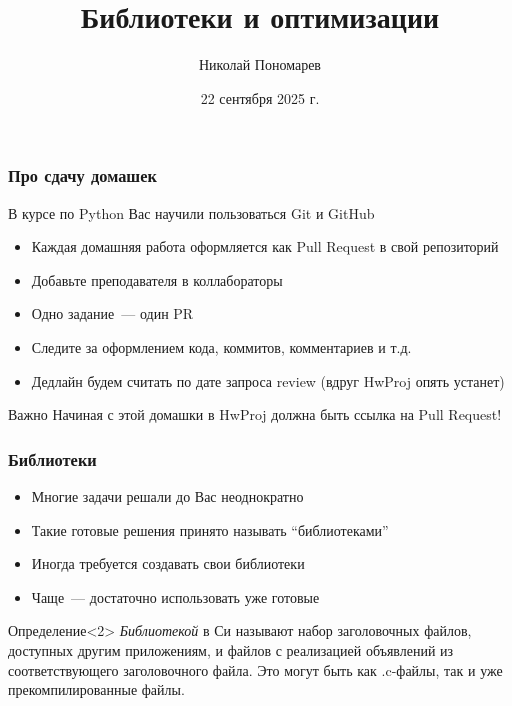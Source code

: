 \documentclass[aspectratio=169]{beamer}
\title{Библиотеки и оптимизации}
\author{Николай Пономарев}
\date{22 сентября 2025 г.}
\begin{document}
\begin{frame}
    \titlepage
\end{frame}

\begin{frame}
    \frametitle{Про сдачу домашек}

    В курсе по Python Вас научили пользоваться Git и GitHub

    \begin{itemize}
        \item Каждая домашняя работа оформляется как Pull Request в свой репозиторий
        \item Добавьте преподавателя в коллабораторы
        \item Одно задание~--- один PR
        \item Следите за оформлением кода, коммитов, комментариев и т.д.
        \item Дедлайн будем считать по дате запроса review (вдруг HwProj опять устанет)
    \end{itemize}

    \begin{alertblock}{Важно}
        Начиная с этой домашки в HwProj должна быть ссылка на Pull Request!
    \end{alertblock}
\end{frame}

\begin{frame}
    \frametitle{Библиотеки}

    \begin{itemize}
        \item Многие задачи решали до Вас неоднократно
        \item Такие готовые решения принято называть \enquote{библиотеками}
        \item Иногда требуется создавать свои библиотеки
        \item Чаще~--- достаточно использовать уже готовые
    \end{itemize}

    \begin{block}{Определение}<2>
        \textit{Библиотекой} в Си называют набор заголовочных файлов, доступных другим приложениям, и файлов с реализацией объявлений из соответствующего заголовочного файла.
        Это могут быть как .c-файлы, так и уже прекомпилированные файлы.
    \end{block}

\end{frame}
\end{document}

